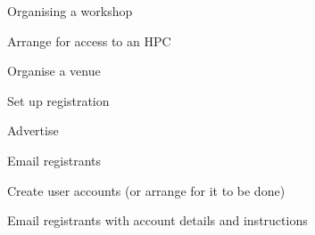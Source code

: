 \begin{frame}{Organising a workshop}
	\begin{myEnumerate}[label={\checkmark}]
		\item Arrange for access to an HPC
		\item Organise a venue
		\item Set up registration
		\item Advertise
		\item Email registrants
		\item Create user accounts (or arrange for it to be done)
		\item Email registrants with account details and instructions
	\end{myEnumerate}
\end{frame}
